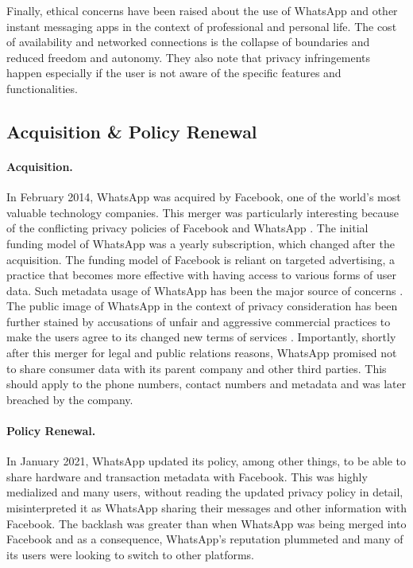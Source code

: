 Finally, ethical concerns have been raised about the use of WhatsApp and other instant messaging apps in the context of professional and personal life.
The cost of availability and networked connections is the collapse of boundaries and reduced freedom and autonomy.
They also note that privacy infringements happen especially if the user is not aware of the specific features and functionalities.

\subsection{Acquisition \& Policy Renewal}

\paragraph{Acquisition.}
In February 2014, WhatsApp was acquired by Facebook, one of the world's most valuable technology companies.
This merger was particularly interesting because of the conflicting privacy policies of Facebook and WhatsApp \citep{esayas2017competition}.
The initial funding model of WhatsApp was a yearly subscription, which changed after the acquisition.
The funding model of Facebook is reliant on targeted advertising, a practice that becomes more effective with having access to various forms of user data.
Such metadata usage of WhatsApp has been the major source of concerns \citep{rastogi2017whatsapp}.
The public image of WhatsApp in the context of privacy consideration has been further stained by accusations of unfair and aggressive commercial practices to make the users agree to its changed new terms of services \citep{zingales2017between}.
Importantly, shortly after this merger for legal and public relations reasons, WhatsApp promised not to share consumer data with its parent company and other third parties.
This should apply to the phone numbers, contact numbers and metadata and was later breached by the company.

\paragraph{Policy Renewal.}

In January 2021, WhatsApp updated its policy, among other things, to be able to share hardware and transaction metadata with Facebook.
This was highly medialized and many users, without reading the updated privacy policy in detail, misinterpreted it as WhatsApp sharing their messages and other information with Facebook.
The backlash was greater than when WhatsApp was being merged into Facebook and as a consequence, WhatsApp's reputation plummeted and many of its users were looking to switch to other platforms.

